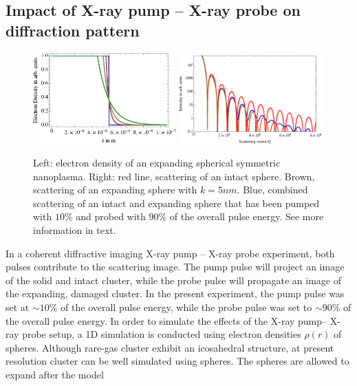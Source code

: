 \subsection{Impact of X-ray pump -- X-ray probe on diffraction pattern}\label{sec:pump--probe-considerations}
\begin{figure}
	\centering
		\includegraphics[width=0.49\textwidth]{images/electron-density-convoluted-object.eps}
		\includegraphics[width=0.49\textwidth]{images/beam-convoluted-with-object.eps}
	\caption[Influence of X-ray pump-- X-ray probe study in diffraction image.]{Left: electron density of an expanding spherical symmetric nanoplasma. Right: red line, scattering of an intact sphere. Brown, scattering of an expanding sphere with $k=5nm$. Blue, combined scattering of an intact and expanding sphere that has been pumped with $10\%$ and probed with $90\%$ of the overall pulse energy. See more information in text.}
	\label{fig:electron-density-convoluted-object}
\end{figure}
In a coherent diffractive imaging X-ray pump -- X-ray probe experiment, both pulses contribute to the scattering image. The pump pulse will project an image of the solid and intact cluster, while the probe pulse will propagate an image of the expanding, damaged cluster. In the present experiment, the pump pulse was set at $\sim10\%$ of the overall pulse energy, while the probe pulse was set to $\sim90\%$ of the overall pulse energy. In order to simulate the effects of the X-ray pump-- X-ray probe setup, a 1D simulation is conducted using electron densities $\rho\left(r\right)$ of spheres. Although rare-gas cluster exhibit an icosahedral structure, at present resolution cluster can be well simulated using spheres. The spheres are allowed to expand after the model
